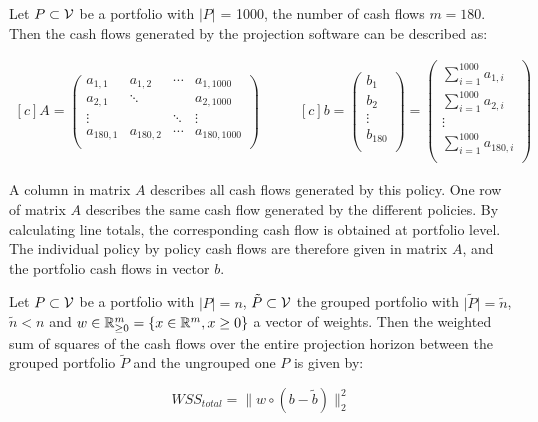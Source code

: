 \begin{example}
	Let $P \subset \mathcal{V}$ be a portfolio with $\vert P \vert$ = 1000, the number of cash flows $m = 180$. Then the cash flows generated by the projection software can be described as:
	
	\begin{equation*}
	\begin{aligned}[c]	
		A= 
		\left( 
			\begin{array}{cccc}
				a_{1,1} 	& a_{1,2} 	& \cdots 	& a_{1,1000} \\
				a_{2,1} 	& \ddots	&  			& a_{2,1000} \\
				\vdots 		&  			& \ddots 	& \vdots \\
				a_{180,1} 	& a_{180,2}	& \cdots 	& a_{180,1000} \\
			\end{array}
		\right)	
	\end{aligned}
	\qquad
	\begin{aligned}[c]
		b = 
		\left( 
			\begin{array}{c}
			b_{1} \\
			b_{2}\\
			\vdots\\
			b_{180}\\
			\end{array}
		\right)	
		=
		\left( 
			\begin{array}{c}
			\sum_{i = 1}^{1000} a_{1,i} \\
			\sum_{i = 1}^{1000} a_{2,i}\\
			\vdots\\
			\sum_{i = 1}^{1000} a_{180,i}\\
			\end{array}
		\right)	
	\end{aligned}	
	\end{equation*}
\end{example}

A column in matrix $A$ describes all cash flows generated by this policy. One row of matrix $A$ describes the same cash flow generated by the different policies. By calculating line totals, the corresponding cash flow is obtained at portfolio level. The individual policy by policy cash flows are therefore given in matrix $A$, and the portfolio cash flows in vector $b$. 

\begin{definition}
	Let $P \subset \mathcal{V}$ be a portfolio with $\vert P \vert = n$, $\tilde{P} \subset \mathcal{V}$  the grouped portfolio with $\vert \tilde{P} \vert = \tilde{n}$, $\tilde{n} < n$ and $w \in \mathbb{R}^m_{\geq 0} = \{x \in \mathbb{R}^m, x \geq 0\}$ a vector of weights. Then the weighted sum of squares of the cash flows over the entire projection horizon between the grouped portfolio $\tilde{P}$ and the ungrouped one $P$ is given by: 
	
	\begin{equation}\label{eq:objective_function}
		WSS_{total} = \lVert w \circ (b - \tilde{b})\lVert_2^2
	\end{equation}
\end{definition}

